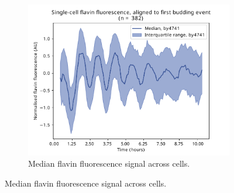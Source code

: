 \begin{figure}
\begin{subfigure}[htpb]{0.4\textwidth}
{    %
   }
   \label{fig:biology-by4741-sync-heatmap}
  \end{subfigure}%
  \begin{subfigure}[htpb]{0.4\textwidth}
   \centering
   \includegraphics[width=\textwidth]{by4741_491_6}
   \caption{
    Median flavin fluorescence signal across cells.%
   }
   \label{fig:biology-by4741-sync-median}
  \end{subfigure}


\end{figure}
